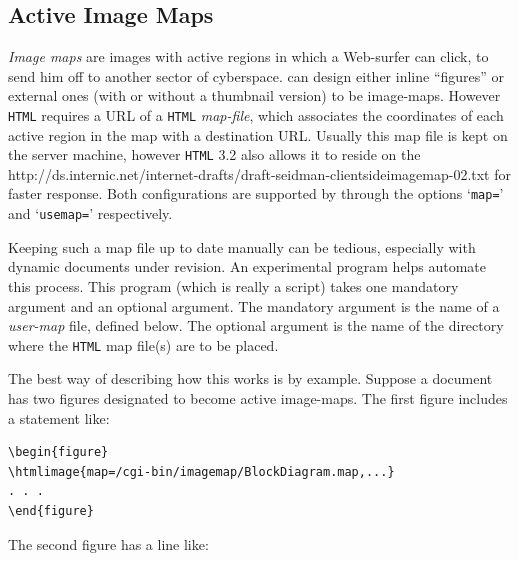 \subsection{Active Image Maps\label{ImageMaps}}%
%
%
%
%
\emph{Image maps} are images with active regions in which a 
Web-surfer can click, to send him off to another sector of cyberspace.  
\latextohtml{} can design either inline ``figures'' or external ones 
(with or without a thumbnail version) to be image-maps.  
However \texttt{HTML} requires a URL of a \texttt{HTML} \emph{map-file}, 
which associates the coordinates of each active region in
the map with a destination URL.  
Usually this map file is kept on the server machine, 
however \texttt{HTML} 3.2 also allows it 
to reside on the %
{http://ds.internic.net/internet-drafts/draft-seidman-clientsideimagemap-02.txt} 
for faster response.  
Both configurations are supported by \latextohtml{} 
through the  options
`\texttt{map=}' and `\texttt{usemap=}' respectively.

%
\html{\\}%

Keeping such a map file up to date manually can be tedious, 
especially with dynamic documents under revision.
An experimental program  helps automate this process.  
This program (which is really a \Perl{} script)
takes one mandatory argument and an optional argument.
The mandatory argument is the name of a \emph{user-map} file,
defined below.  The optional argument is the name of the
directory where the \texttt{HTML} map file(s) are to be placed.

\html{\\}%
The best way of describing how this works is by example.
Suppose a document has two figures designated to
become active image-maps.  The first
figure includes a statement like:
\begin{small}
\begin{verbatim}
\begin{figure}
\htmlimage{map=/cgi-bin/imagemap/BlockDiagram.map,...}
. . .
\end{figure}
\end{verbatim}
\end{small}
The second figure has a line like:

